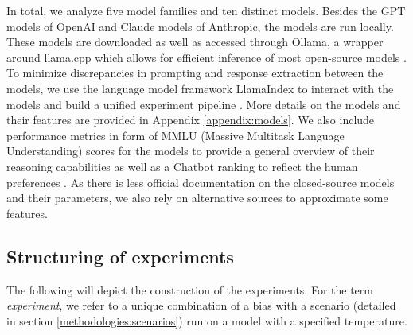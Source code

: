\setlength{\parindent}{0pt}
\par In total, we analyze five model families and ten distinct models. Besides the GPT models of OpenAI and Claude models of Anthropic, the models are run locally. These models are downloaded as well as accessed through Ollama, a wrapper around llama.cpp which allows for efficient inference of most open-source models \parencite{gerganov2023llamacpp}. To minimize discrepancies in prompting and response extraction between the models, we use the language model framework LlamaIndex to interact with the models and build a unified experiment pipeline \parencite{liullamaindex2022}. More details on the models and their features are provided in Appendix \ref{appendix:models}. We also include performance metrics in form of MMLU (Massive Multitask Language Understanding) scores for the models to provide a general overview of their reasoning capabilities \parencite{hendrycks2020measuring} as well as a Chatbot ranking to reflect the human preferences \parencite{chiang2024chatbot}. As there is less official documentation on the closed-source models and their parameters, we also rely on alternative sources to approximate some features.


\subsection{Structuring of experiments}
\par The following will depict the construction of the experiments. For the term \textit{experiment}, we refer to a unique combination of a bias with a scenario (detailed in section \ref{methodologies:scenarios}) run on a model with a specified temperature.

